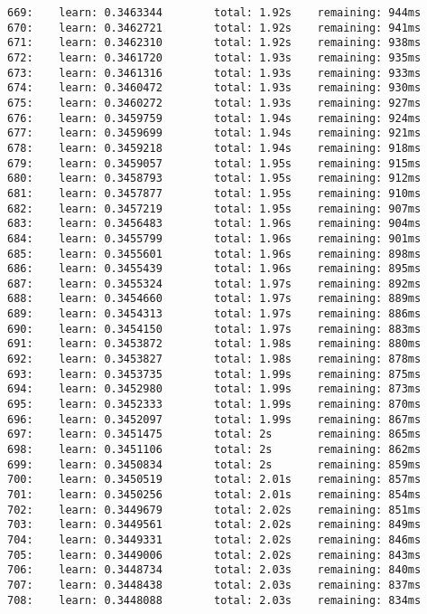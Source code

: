 \documentclass[11pt]{article}
\begin{document}
\begin{Verbatim}[commandchars=\\\{\}]
669:    learn: 0.3463344        total: 1.92s    remaining: 944ms
670:    learn: 0.3462721        total: 1.92s    remaining: 941ms
671:    learn: 0.3462310        total: 1.92s    remaining: 938ms
672:    learn: 0.3461720        total: 1.93s    remaining: 935ms
673:    learn: 0.3461316        total: 1.93s    remaining: 933ms
674:    learn: 0.3460472        total: 1.93s    remaining: 930ms
675:    learn: 0.3460272        total: 1.93s    remaining: 927ms
676:    learn: 0.3459759        total: 1.94s    remaining: 924ms
677:    learn: 0.3459699        total: 1.94s    remaining: 921ms
678:    learn: 0.3459218        total: 1.94s    remaining: 918ms
679:    learn: 0.3459057        total: 1.95s    remaining: 915ms
680:    learn: 0.3458793        total: 1.95s    remaining: 912ms
681:    learn: 0.3457877        total: 1.95s    remaining: 910ms
682:    learn: 0.3457219        total: 1.95s    remaining: 907ms
683:    learn: 0.3456483        total: 1.96s    remaining: 904ms
684:    learn: 0.3455799        total: 1.96s    remaining: 901ms
685:    learn: 0.3455601        total: 1.96s    remaining: 898ms
686:    learn: 0.3455439        total: 1.96s    remaining: 895ms
687:    learn: 0.3455324        total: 1.97s    remaining: 892ms
688:    learn: 0.3454660        total: 1.97s    remaining: 889ms
689:    learn: 0.3454313        total: 1.97s    remaining: 886ms
690:    learn: 0.3454150        total: 1.97s    remaining: 883ms
691:    learn: 0.3453872        total: 1.98s    remaining: 880ms
692:    learn: 0.3453827        total: 1.98s    remaining: 878ms
693:    learn: 0.3453735        total: 1.99s    remaining: 875ms
694:    learn: 0.3452980        total: 1.99s    remaining: 873ms
695:    learn: 0.3452333        total: 1.99s    remaining: 870ms
696:    learn: 0.3452097        total: 1.99s    remaining: 867ms
697:    learn: 0.3451475        total: 2s       remaining: 865ms
698:    learn: 0.3451106        total: 2s       remaining: 862ms
699:    learn: 0.3450834        total: 2s       remaining: 859ms
700:    learn: 0.3450519        total: 2.01s    remaining: 857ms
701:    learn: 0.3450256        total: 2.01s    remaining: 854ms
702:    learn: 0.3449679        total: 2.02s    remaining: 851ms
703:    learn: 0.3449561        total: 2.02s    remaining: 849ms
704:    learn: 0.3449331        total: 2.02s    remaining: 846ms
705:    learn: 0.3449006        total: 2.02s    remaining: 843ms
706:    learn: 0.3448734        total: 2.03s    remaining: 840ms
707:    learn: 0.3448438        total: 2.03s    remaining: 837ms
708:    learn: 0.3448088        total: 2.03s    remaining: 834ms

\end{Verbatim}
\end{document}

